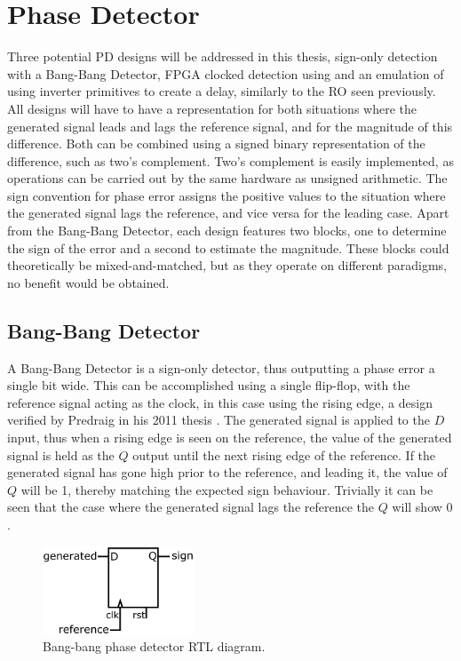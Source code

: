 \section{Phase Detector}
Three potential \acl{PD} designs will be addressed in this thesis, sign-only detection with a Bang-Bang Detector, \ac{FPGA} clocked detection using  and an emulation of  using inverter primitives to create a delay, similarly to the \ac{RO} seen previously. All designs will have to have a representation for both situations where the generated signal leads and lags the reference signal, and for the magnitude of this difference. Both can be combined using a signed binary representation of the difference, such as two's complement. Two's complement is easily implemented, as operations can be carried out by the same hardware as unsigned arithmetic. The sign convention for phase error assigns the positive values to the situation where the generated signal lags the reference, and vice versa for the leading case. Apart from the Bang-Bang Detector, each design features two blocks, one to determine the sign of the error and a second to estimate the magnitude. These blocks could theoretically be mixed-and-matched, but as they operate on different paradigms, no benefit would be obtained.

\subsection{Bang-Bang Detector}
A Bang-Bang Detector is a sign-only detector, thus outputting a phase error a single bit wide. This can be accomplished using a single flip-flop, with the reference signal acting as the clock, in this case using the rising edge, a design verified by Predraig in his 2011 thesis \cite{predraig}. The generated signal is applied to the $D$ input, thus when a rising edge is seen on the reference, the value of the generated signal is held as the $Q$ output until the next rising edge of the reference. If the generated signal has gone high prior to the reference, and leading it, the value of $Q$ will be 1, thereby matching the expected sign behaviour. Trivially it can be seen that the case where the generated signal lags the reference the $Q$ will show $0$.
\begin{figure}[h]
	\centering
	\includegraphics[width=0.4\textwidth]{../BB}
	\caption[Bang-bang phase detector \ac{RTL} diagram]{Bang-bang phase detector \ac{RTL} diagram.}
	\label{fig:bang_bang}
\end{figure}

